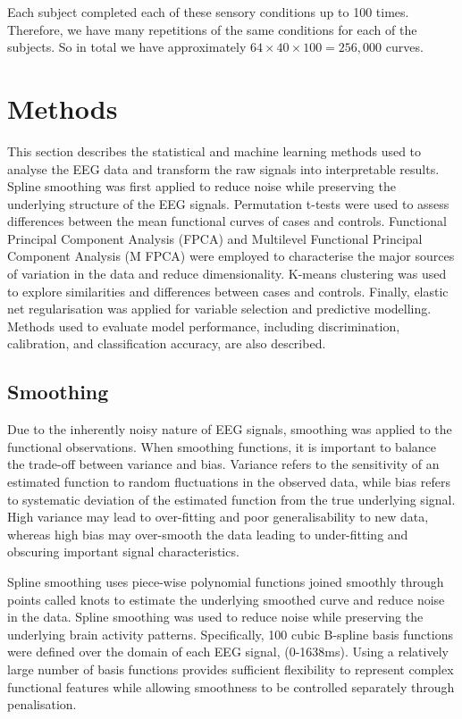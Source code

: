 \documentclass{article}
\begin{document}
Each subject completed each of these sensory conditions up to 100 times.
Therefore, we have many repetitions of the same conditions for each of
the subjects. So in total we have approximately
\(64\times 40 \times 100 = 256,000\) curves.

\section{Methods}\label{methods}

\label{sec:methods}

This section describes the statistical and machine learning methods used
to analyse the EEG data and transform the raw signals into interpretable
results. Spline smoothing was first applied to reduce noise while
preserving the underlying structure of the EEG signals. Permutation
t-tests were used to assess differences between the mean functional
curves of cases and controls. Functional Principal Component Analysis
(FPCA) and Multilevel Functional Principal Component Analysis (M FPCA)
were employed to characterise the major sources of variation in the data
and reduce dimensionality. K-means clustering was used to explore
similarities and differences between cases and controls. Finally,
elastic net regularisation was applied for variable selection and
predictive modelling. Methods used to evaluate model performance,
including discrimination, calibration, and classification accuracy, are
also described.

\subsection{Smoothing}\label{smoothing}

Due to the inherently noisy nature of EEG signals, smoothing was applied
to the functional observations. When smoothing functions, it is
important to balance the trade-off between variance and bias. Variance
refers to the sensitivity of an estimated function to random
fluctuations in the observed data, while bias refers to systematic
deviation of the estimated function from the true underlying signal.
High variance may lead to over-fitting and poor generalisability to new
data, whereas high bias may over-smooth the data leading to
under-fitting and obscuring important signal characteristics.

Spline smoothing uses piece-wise polynomial functions joined smoothly
through points called knots to estimate the underlying smoothed curve
and reduce noise in the data. Spline smoothing was used to reduce noise
while preserving the underlying brain activity patterns. Specifically,
100 cubic B-spline basis functions were defined over the domain of each
EEG signal, (0-1638ms). Using a relatively large number of basis
functions provides sufficient flexibility to represent complex
functional features while allowing smoothness to be controlled
separately through penalisation.
\end{document}
